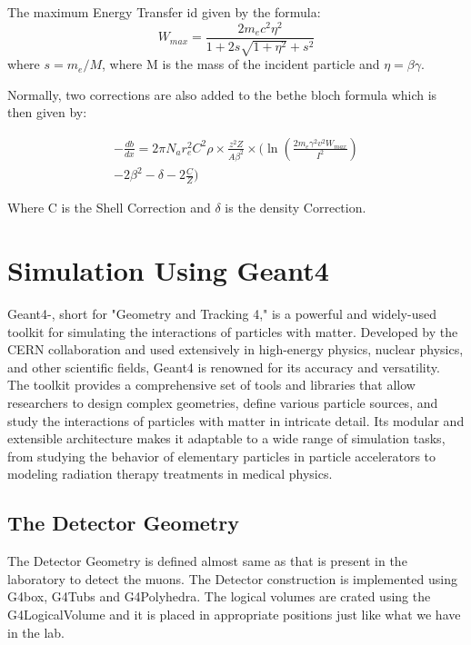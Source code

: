 \documentclass{article}
\begin{document}
\begin{multicols}{2}
The maximum Energy Transfer id given by the formula:
\begin{equation}
    W_{max} = \frac{2m_e c^2 \eta^2}{1+2s\sqrt{1+\eta^2}+s^2}
\end{equation}
where $s=m_e/M$, where M is the mass of the incident particle and $\eta=\beta\gamma$.

Normally, two corrections are also added to the bethe bloch formula which is then given by:



\begin{eqnarray}
        -\frac{db}{dx} = 2 \pi N_a r_e^2 C^2 \rho \times\frac{z^2 Z}{A \beta^2} \times (\ln{(\frac{2 m_e \gamma^2 v^2 W_{max}}{I^2})} \\ -2\beta^2 - \delta - 2\frac{C}{Z})
\end{eqnarray} 


Where C is the Shell Correction and $\delta$ is the density Correction.


\section{Simulation Using Geant4}


Geant4-\cite{agostinelli2003geant4}, short for "Geometry and Tracking 4," is a powerful and 
widely-used toolkit for simulating the interactions of particles with matter. 
Developed by the CERN collaboration and used extensively in high-energy physics, 
nuclear physics, and other scientific fields, Geant4 is renowned for its accuracy 
and versatility. The toolkit provides a comprehensive set of tools and 
libraries that allow researchers to design complex geometries, define 
various particle sources, and study the interactions of particles with matter 
in intricate detail. Its modular and extensible architecture makes it adaptable 
to a wide range of simulation tasks, from studying the behavior of elementary 
particles in particle accelerators to modeling radiation therapy treatments in 
medical physics.


\subsection{The Detector Geometry}

The Detector Geometry is defined almost same as that is present in the laboratory to detect the muons. The Detector
construction is implemented using G4box, G4Tubs and G4Polyhedra. The logical volumes are crated using the G4LogicalVolume
and it is placed in appropriate positions just like what we have in the lab.


\end{multicols}
\end{document}
